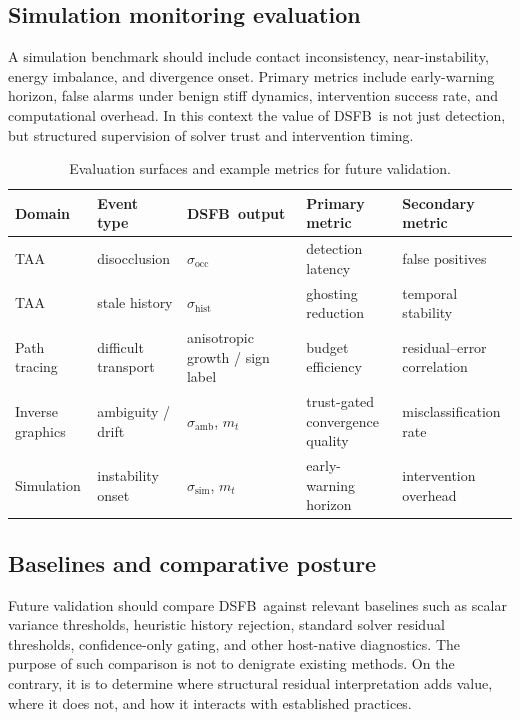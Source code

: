 \documentclass[11pt]{article}
\newcommand{\dsfb}{\textsc{DSFB}}
\newcommand{\metares}{m}
\theoremstyle{definition}
\theoremstyle{plain}
\begin{document}
\subsection{Simulation monitoring evaluation}
A simulation benchmark should include contact inconsistency, near-instability, energy imbalance, and divergence onset. Primary metrics include early-warning horizon, false alarms under benign stiff dynamics, intervention success rate, and computational overhead. In this context the value of \dsfb\ is not just detection, but structured supervision of solver trust and intervention timing.

\begin{table}[H]
\centering
\caption{Evaluation surfaces and example metrics for future validation.}
\label{tab:evaluation}
\begin{tabularx}{\textwidth}{>{\raggedright\arraybackslash}p{} >{\raggedright\arraybackslash}p{} >{\raggedright\arraybackslash}p{} >{\raggedright\arraybackslash}p{} >{\raggedright\arraybackslash}X}
\toprule
\textbf{Domain} & \textbf{Event type} & \textbf{\dsfb\ output} & \textbf{Primary metric} & \textbf{Secondary metric} \\
\midrule
TAA & disocclusion & $\sigma_{\mathrm{occ}}$ & detection latency & false positives \\
TAA & stale history & $\sigma_{\mathrm{hist}}$ & ghosting reduction & temporal stability \\
Path tracing & difficult transport & anisotropic growth / sign label & budget efficiency & residual--error correlation \\
Inverse graphics & ambiguity / drift & $\sigma_{\mathrm{amb}}$, $\metares_t$ & trust-gated convergence quality & misclassification rate \\
Simulation & instability onset & $\sigma_{\mathrm{sim}}$, $\metares_t$ & early-warning horizon & intervention overhead \\
\bottomrule
\end{tabularx}
\end{table}

\subsection{Baselines and comparative posture}
Future validation should compare \dsfb\ against relevant baselines such as scalar variance thresholds, heuristic history rejection, standard solver residual thresholds, confidence-only gating, and other host-native diagnostics. The purpose of such comparison is not to denigrate existing methods. On the contrary, it is to determine where structural residual interpretation adds value, where it does not, and how it interacts with established practices.
\end{document}
